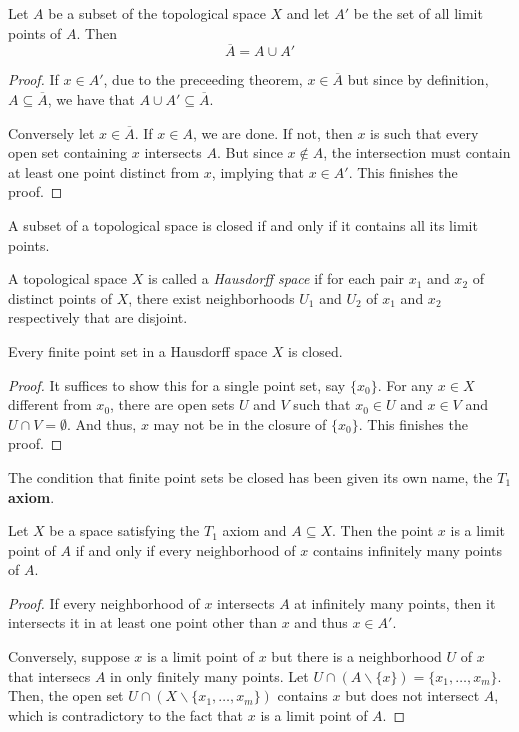 \begin{theorem}
    Let $A$ be a subset of the topological space $X$ and let $A'$ be the set of all limit points of $A$. Then 
    \begin{equation*}
        \overline{A} = A\cup A'
    \end{equation*}
\end{theorem}
\begin{proof}
    If $x\in A'$, due to the preceeding theorem, $x\in\overline{A}$ but since by definition, $A\subseteq\overline{A}$, we have that $A\cup A'\subseteq\overline{A}$.

    Conversely let $x\in\overline{A}$. If $x\in A$, we are done. If not, then $x$ is such that every open set containing $x$ intersects $A$. But since $x\notin A$, the intersection must contain at least one point distinct from $x$, implying that $x\in A'$. This finishes the proof.
\end{proof}
\begin{corollary}
    A subset of a topological space is closed if and only if it contains all its limit points.
\end{corollary}

\begin{definition}
    A topological space $X$ is called a \textit{Hausdorff space} if for each pair $x_1$ and $x_2$ of distinct points of $X$, there exist neighborhoods $U_1$ and $U_2$ of $x_1$ and $x_2$ respectively that are disjoint.
\end{definition}

\begin{theorem}
    Every finite point set in a Hausdorff space $X$ is closed.
\end{theorem}
\begin{proof}
    It suffices to show this for a single point set, say $\{x_0\}$. For any $x\in X$ different from $x_0$, there are open sets $U$ and $V$ such that $x_0\in U$ and $x\in V$ and $U\cap V=\emptyset$. And thus, $x$ may not be in the closure of $\{x_0\}$. This finishes the proof.
\end{proof}

The condition that finite point sets be closed has been given its own name, the \textbf{$T_1$ axiom}.

\begin{theorem}
    Let $X$ be a space satisfying the $T_1$ axiom and $A\subseteq X$. Then the point $x$ is a limit point of $A$ if and only if every neighborhood of $x$ contains infinitely many points of $A$.
\end{theorem}
\begin{proof}
    If every neighborhood of $x$ intersects $A$ at infinitely many points, then it intersects it in at least one point other than $x$ and thus $x\in A'$.
    
    Conversely, suppose $x$ is a limit point of $x$ but there is a neighborhood $U$ of $x$ that intersecs $A$ in only finitely many points. Let $U\cap(A\backslash\{x\}) = \{x_1,\ldots,x_m\}$. Then, the open set $U\cap(X\backslash\{x_1,\ldots,x_m\})$ contains $x$ but does not intersect $A$, which is contradictory to the fact that $x$ is a limit point of $A$.
\end{proof}

